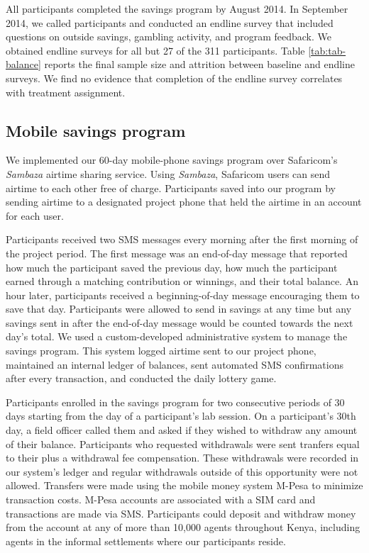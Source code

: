 \documentclass[11pt]{article}
\begin{document}

		All participants completed the savings program by August 2014. In September 2014, we called participants and conducted an endline survey that included questions on outside savings, gambling activity, and program feedback. We obtained endline surveys for all but 27 of the 311 participants. Table \ref{tab:tab-balance} reports the final sample size and attrition between baseline and endline surveys. We find no evidence that completion of the endline survey correlates with treatment assignment.


		

	\subsection{Mobile savings program}

		We implemented our 60-day mobile-phone savings program over Safaricom's \textit{Sambaza} airtime sharing service. Using \textit{Sambaza}, Safaricom users can send airtime to each other free of charge. Participants saved into our program by sending airtime to a designated project phone that held the airtime in an account for each user.

		Participants received two SMS messages every morning after the first morning of the project period. The first message was an end-of-day message that reported how much the participant saved the previous day, how much the participant earned through a matching contribution or winnings, and their total balance. An hour later, participants received a beginning-of-day message encouraging them to save that day. Participants were allowed to send in savings at any time but any savings sent in after the end-of-day message would be counted towards the next day's total. We used a custom-developed administrative system to manage the savings program. This system logged airtime sent to our project phone, maintained an internal ledger of balances, sent automated SMS confirmations after every transaction, and conducted the daily lottery game.

		Participants enrolled in the savings program for two consecutive periods of 30 days starting from the day of a participant's lab session. On a participant's 30th day, a field officer called them and asked if they wished to withdraw any amount of their balance. Participants who requested withdrawals were sent tranfers equal to their plus a withdrawal fee compensation. These withdrawals were recorded in our system's ledger and regular withdrawals outside of this opportunity were not allowed. Transfers were made using the mobile money system M-Pesa to minimize transaction costs. M-Pesa accounts are associated with a SIM card and transactions are made via SMS. Participants could deposit and withdraw money from the account at any of more than 10,000 agents throughout Kenya, including agents in the informal settlements where our participants reside.
\end{document}
